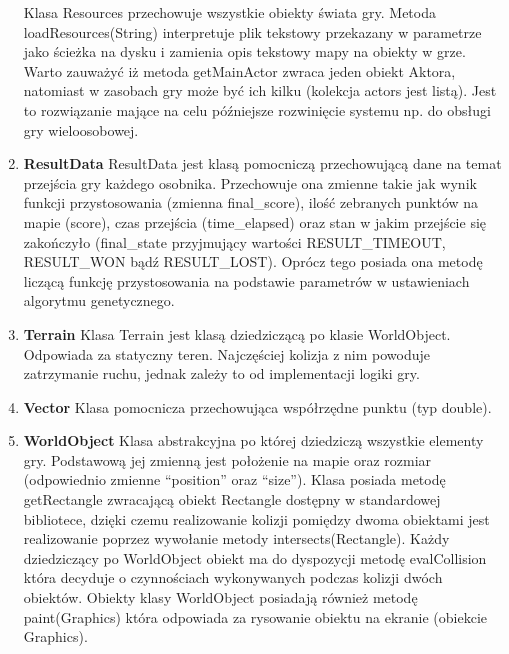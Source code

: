\begin{par}
\begin{enumerate}
	Klasa Resources przechowuje wszystkie obiekty świata gry. Metoda loadResources(String) interpretuje plik tekstowy przekazany w parametrze jako ścieżka na dysku i zamienia opis tekstowy mapy na obiekty w grze. Warto zauważyć iż metoda getMainActor zwraca jeden obiekt Aktora, natomiast w zasobach gry może być ich kilku (kolekcja actors jest listą). Jest to rozwiązanie mające na celu późniejsze rozwinięcie systemu np. do obsługi gry wieloosobowej.
	\item{\bf ResultData }\newline
	ResultData jest klasą pomocniczą przechowującą dane na temat przejścia gry każdego osobnika. Przechowuje ona zmienne takie jak wynik funkcji przystosowania (zmienna final\_score), ilość zebranych punktów na mapie (score), czas przejścia (time\_elapsed) oraz stan w jakim przejście się zakończyło (final\_state przyjmujący wartości RESULT\_TIMEOUT, RESULT\_WON bądź RESULT\_LOST). Oprócz tego posiada ona metodę liczącą funkcję przystosowania na podstawie parametrów w ustawieniach algorytmu genetycznego.
	\item{\bf Terrain }\newline
	Klasa Terrain jest klasą dziedziczącą po klasie WorldObject. Odpowiada za statyczny teren. Najczęściej kolizja z nim powoduje zatrzymanie ruchu, jednak zależy to od implementacji logiki gry.
	\item{\bf Vector }\newline
	Klasa pomocnicza przechowująca współrzędne punktu (typ double).
	\item{\bf WorldObject }\newline
	Klasa abstrakcyjna po której dziedziczą wszystkie elementy gry. Podstawową jej zmienną jest położenie na mapie oraz rozmiar (odpowiednio zmienne ``position'' oraz ``size'').
	Klasa posiada metodę getRectangle zwracającą obiekt Rectangle dostępny w standardowej bibliotece, dzięki czemu realizowanie kolizji pomiędzy dwoma obiektami jest realizowanie poprzez wywołanie metody intersects(Rectangle). Każdy dziedziczący po WorldObject obiekt ma do dyspozycji metodę evalCollision która decyduje o czynnościach wykonywanych podczas kolizji dwóch obiektów. Obiekty klasy WorldObject posiadają również metodę paint(Graphics) która odpowiada za rysowanie obiektu na ekranie (obiekcie Graphics).
	\end{enumerate}

\end{par}


